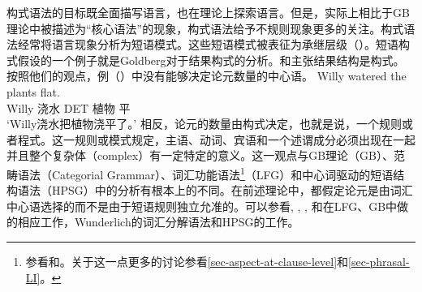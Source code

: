 \noindent
构式语法的目标既全面描写语言，也在理论上探索语言。但是，实际上相比于GB理论中被描述为“核心语法”的现象，构式语法给予不规则现象更多的关注。构式语法经常将语言现象分析为短语模式。这些短语模式被表征为承继层级（\egc \citealp{Croft2001a,Goldberg2003a}）。短语构式假设的一个例子就是Goldberg对于结果构式的分析。\citet{Goldberg95a}和\citet{GJ2004a}主张结果结构是构式。按照他们的观点，例（）中没有能够决定论元数量的中心语。
%
\ea
\gll Willy watered the plants flat.\\
	 Willy 浇水 DET 植物 平\\
\glt `Willy浇水把植物浇平了。'
\z
相反，论元的数量由构式决定，也就是说，一个规则或者程式。这一规则或模式规定，主语、动词、宾语和一个述谓成分必须出现在一起并且整个复杂体（complex）有一定特定的意义。这一观点与GB理论\indexgbc（GB）、范畴语法\indexcgc（Categorial Grammar）、词汇功能语法\footnote{参看和。关于这一点更多的讨论参看\ref{sec-aspect-at-clause-level}和\ref{sec-phrasal-LI}。%
}\indexlfgc（LFG）和中心词驱动的短语结构语法\indexhpsgc（HPSG）中的分析有根本上的不同。在前述理论中，都假定论元是由词汇中心语选择的而不是由于短语规则独立允准的。可以参看, , , 和在LFG、GB中做的相应工作，Wunderlich的词汇分解语法和HPSG的工作。

